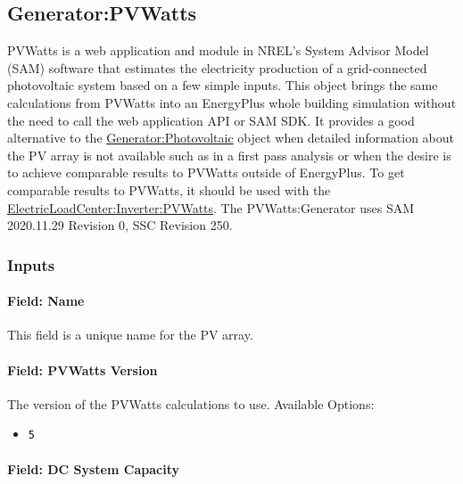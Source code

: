 \subsection{Generator:PVWatts}\label{generatorpvwatts}

PVWatts is a web application and module in NREL's System Advisor Model (SAM) software that estimates the electricity production of a grid-connected photovoltaic system based on a few simple inputs. This object brings the same calculations from PVWatts into an EnergyPlus whole building simulation without the need to call the web application API or SAM SDK. It provides a good alternative to the \hyperref[generatorphotovoltaic-000]{Generator:Photovoltaic} object when detailed information about the PV array is not available such as in a first pass analysis or when the desire is to achieve comparable results to PVWatts outside of EnergyPlus. To get comparable results to PVWatts, it should be used with the \hyperref[electricloadcenterinverterpvwatts]{ElectricLoadCenter:Inverter:PVWatts}. The PVWatts:Generator uses SAM 2020.11.29 Revision 0, SSC Revision 250.

\subsubsection{Inputs}\label{input-description}

\paragraph{Field: Name}\label{generatorpvwatts-field-name}

This field is a unique name for the PV array.

\paragraph{Field: PVWatts Version}\label{field-pvwatts-version}

The version of the PVWatts calculations to use. Available Options:

\begin{itemize}
\tightlist
\item
  \texttt{5}
\end{itemize}

\paragraph{Field: DC System Capacity}\label{field-dc-system-capacity}

